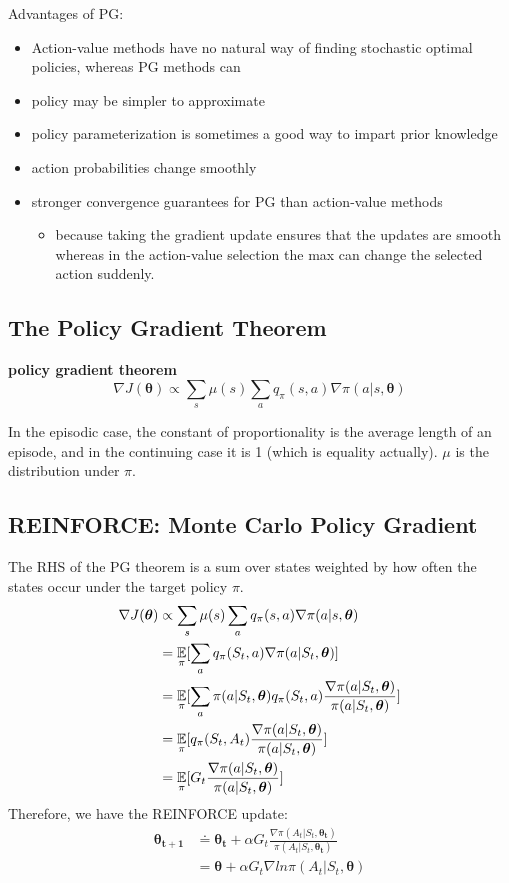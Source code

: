 \documentclass[sutton_barto_notes.tex]{subfiles}
\begin{document}
Advantages of PG:
\begin{itemize}
\item Action-value methods have no natural way of finding stochastic optimal policies, whereas PG methods can
\item policy may be simpler to approximate
\item policy parameterization is sometimes a good way to impart prior knowledge
\item action probabilities change smoothly
\item stronger convergence guarantees for PG than action-value methods
\begin{itemize}
	\item because taking the gradient update ensures that the updates are smooth whereas in the action-value selection the max can change the selected action suddenly.
\end{itemize}
\end{itemize}


\subsection{The Policy Gradient Theorem}

\begin{definition}
\textbf{policy gradient theorem}
$$\nabla J(\bm{\theta}) \propto \sum_s\mu(s)\sum_a q_\pi(s,a)\nabla\pi(a|s,\bm{\theta})$$
\end{definition}
In the episodic case, the constant of proportionality is the average length of an episode, and in the continuing case it is 1 (which is equality actually). $\mu$ is the distribution under $\pi$.

\subsection{REINFORCE: Monte Carlo Policy Gradient}

The RHS of the PG theorem is a sum over states weighted by how often the states occur under the target policy $\pi$.
\begin{align*}
\nabla J(\bm{\theta}) & \propto \sum_s\mu(s)\sum_a q_\pi(s,a)\nabla\pi(a|s,\bm{\theta}) \\
&= \operatorname*{\mathbb{E}}_\pi [\sum_a q_\pi(S_t, a)\nabla\pi(a|S_t, \bm{\theta})] \\
&= \operatorname*{\mathbb{E}}_\pi [\sum_a \pi(a|S_t,\bm{\theta}) q_\pi(S_t, a) \frac{\nabla\pi(a|S_t, \bm{\theta})}{\pi(a|S_t, \bm{\theta})} ] \\
&= \operatorname*{\mathbb{E}}_\pi [q_\pi(S_t, A_t) \frac{\nabla\pi(a|S_t, \bm{\theta})}{\pi(a|S_t, \bm{\theta})}] \\
&= \operatorname*{\mathbb{E}}_\pi [G_t \frac{\nabla\pi(a|S_t, \bm{\theta})}{\pi(a|S_t, \bm{\theta})}]
\end{align*}
Therefore, we have the REINFORCE update:
\begin{align*}
\bm{\theta_{t+1}} &\doteq \bm{\theta_t} + \alpha G_t \frac{\nabla\pi(A_t|S_t,\bm{\theta_t})}{\pi(A_t|S_t,\bm{\theta_t})} \\
&= \bm{\theta} + \alpha G_t \nabla ln \pi(A_t|S_t, \bm{\theta})
\end{align*}
\end{document}
